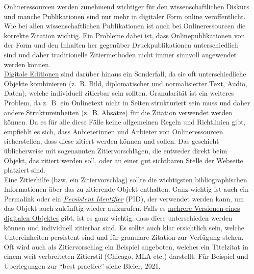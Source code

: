 \documentclass{article}
\begin{document}
    Onlineressourcen werden zunehmend wichtiger für den wissenschaftlichen Diskurs und
                  manche Publikationen sind nur mehr in digitaler Form online veröffentlicht. Wie
                  bei allen wissenschaftlichen Publikationen ist auch bei Onlineressourcen die
                  korrekte Zitation wichtig. Ein Probleme dabei ist, dass Onlinepublikationen von
                  der Form und den Inhalten her gegenüber Druckpublikationen unterschiedlich sind
                  und daher traditionelle Zitiermethoden nicht immer sinnvoll angewendet werden
                  können. \\
            
        \href{http://gams.uni-graz.at/o:konde.59}{Digitale Editionen} sind darüber
                  hinaus ein Sonderfall, da sie oft unterschiedliche Objekte kombinieren (z. B.
                  Bild, diplomatischer und normalisierter Text, Audio, Daten), welche individuell
                  zitierbar sein sollten. Granularität ist ein weiteres Problem, da z. B. ein
                  Onlinetext nicht in Seiten strukturiert sein muss und daher andere
                  Struktureinheiten (z. B. Absätze) für die Zitation verwendet werden können. Da es
                  für alle diese Fälle keine allgemeinen Regeln und Richtlinien gibt, empfiehlt es
                  sich, dass Anbieterinnen und Anbieter von Onlineressourcen sicherstellen, dass
                  diese zitiert werden können und sollen. Das geschieht üblicherweise mit
                  sogenannten Zitiervorschlägen, die entweder direkt beim Objekt, das zitiert werden
                  soll, oder an einer gut sichtbaren Stelle der Webseite platziert sind. \\
            
        Eine Zitierhilfe (bzw. ein Zitiervorschlag) sollte die wichtigsten
                  bibliographischen Informationen über das zu zitierende Objekt enthalten. Ganz
                  wichtig ist auch ein Permalink oder ein \emph{\href{http://gams.uni-graz.at/o:konde.12}{Persistent Identifier}} (PID), der verwendet werden kann, um das Objekt auch zukünftig wieder
                  aufzurufen. Falls es \href{http://gams.uni-graz.at/o:konde.14}{mehrere Versionen
                     eines digitalen Objektes} gibt, ist es ganz wichtig, dass diese
                  unterschieden werden können und individuell zitierbar sind. Es sollte auch klar
                  ersichtlich sein, welche Untereinheiten persistent sind und für granulare Zitation
                  zur Verfügung stehen. Oft wird auch als Zitiervorschlag ein Beispiel angeboten,
                  welches ein Titelzitat in einem weit verbreiteten Zitierstil (Chicago, MLA etc.)
                  darstellt. Für Beispiel und Überlegungen zur “best practice” siehe Bleier,
                     2021.\\
            
\end{document}
